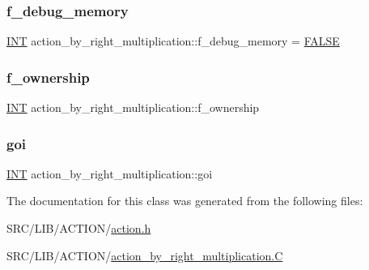 \subsubsection{\texorpdfstring{f\+\_\+debug\+\_\+memory}{f\_debug\_memory}}
{\footnotesize\ttfamily \mbox{\hyperlink{galois_8h_a09fddde158a3a20bd2dcadb609de11dc}{I\+NT}} action\+\_\+by\+\_\+right\+\_\+multiplication\+::f\+\_\+debug\+\_\+memory = \mbox{\hyperlink{nauty_8h_aa93f0eb578d23995850d61f7d61c55c1}{F\+A\+L\+SE}}\hspace{0.3cm}{\ttfamily [static]}}

\mbox{\label{classaction__by__right__multiplication_a0311dcdd5acad535093907b644cf3966}} 
\subsubsection{\texorpdfstring{f\+\_\+ownership}{f\_ownership}}
{\footnotesize\ttfamily \mbox{\hyperlink{galois_8h_a09fddde158a3a20bd2dcadb609de11dc}{I\+NT}} action\+\_\+by\+\_\+right\+\_\+multiplication\+::f\+\_\+ownership}

\mbox{\label{classaction__by__right__multiplication_a1a494eebe67e491ada8973cc68a949ad}} 
\subsubsection{\texorpdfstring{goi}{goi}}
{\footnotesize\ttfamily \mbox{\hyperlink{galois_8h_a09fddde158a3a20bd2dcadb609de11dc}{I\+NT}} action\+\_\+by\+\_\+right\+\_\+multiplication\+::goi}



The documentation for this class was generated from the following files\+:\begin{DoxyCompactItemize}
\item 
S\+R\+C/\+L\+I\+B/\+A\+C\+T\+I\+O\+N/\mbox{\hyperlink{action_8h}{action.\+h}}\item 
S\+R\+C/\+L\+I\+B/\+A\+C\+T\+I\+O\+N/\mbox{\hyperlink{action__by__right__multiplication_8_c}{action\+\_\+by\+\_\+right\+\_\+multiplication.\+C}}\end{DoxyCompactItemize}
